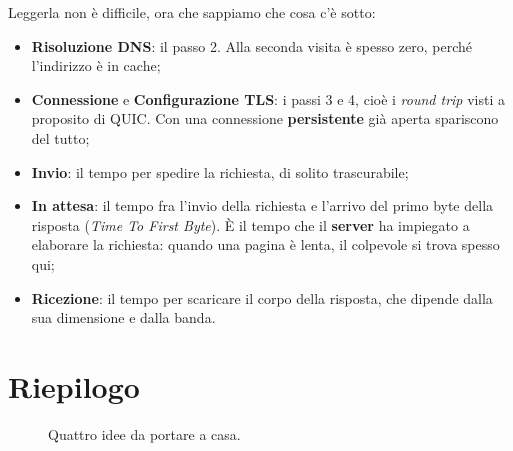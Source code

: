 Leggerla non è difficile, ora che sappiamo che cosa c'è sotto:
\begin{itemize}
  \item \textbf{Risoluzione DNS}: il passo 2. Alla seconda visita è spesso zero,
        perché l'indirizzo è in cache;
  \item \textbf{Connessione} e \textbf{Configurazione TLS}: i passi 3 e 4, cioè
        i \textit{round trip} visti a proposito di QUIC. Con una connessione
        \textbf{persistente} già aperta spariscono del tutto;
  \item \textbf{Invio}: il tempo per spedire la richiesta, di solito
        trascurabile;
  \item \textbf{In attesa}: il tempo fra l'invio della richiesta e l'arrivo del
        primo byte della risposta (\textit{Time To First Byte}). È il tempo che
        il \textbf{server} ha impiegato a elaborare la richiesta: quando una
        pagina è lenta, il colpevole si trova spesso qui;
  \item \textbf{Ricezione}: il tempo per scaricare il corpo della risposta, che
        dipende dalla sua dimensione e dalla banda.
\end{itemize}

\section{Riepilogo}

\begin{figure}[H]
\centering
{}
\caption{Quattro idee da portare a casa.}
\end{figure}

